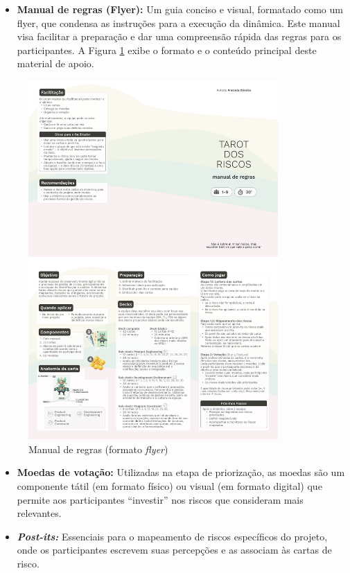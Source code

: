 \documentclass[
	12pt,
	openright,
	twoside,
	a4paper,
	english,
	brazil
	]{abntex2}
\begin{document}
\begin{itemize}
\item \textbf{Manual de regras (Flyer):} Um guia conciso e visual, formatado como um flyer, que condensa as instruções para a execução da dinâmica. Este manual visa facilitar a preparação e dar uma compreensão rápida das regras para os participantes. A Figura \ref{manual-tarot} exibe o formato e o conteúdo principal deste material de apoio.
\end{itemize}

\begin{figure}[H]
\centering
\caption{\label{manual-tarot} Manual de regras (formato \textit{flyer})}
\includegraphics[width=0.85\textwidth]{manual-tarot}
\end{figure}

\begin{itemize}
\item \textbf{Moedas de votação:} Utilizadas na etapa de priorização, as moedas são um componente tátil (em formato físico) ou visual (em formato digital) que permite aos participantes “investir” nos riscos que consideram mais relevantes.
\item \textit{\textbf{Post-its:}} Essenciais para o mapeamento de riscos específicos do projeto, onde os participantes escrevem suas percepções e as associam às cartas de risco.
\end{itemize}
\end{document}
